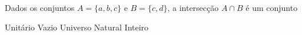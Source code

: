 Dados os conjuntos $A=\{a,b,c\}$ e $B=\{c,d\}$, a intersecção $A\cap B$ é um conjunto

Unitário
Vazio
Universo
Natural
Inteiro







